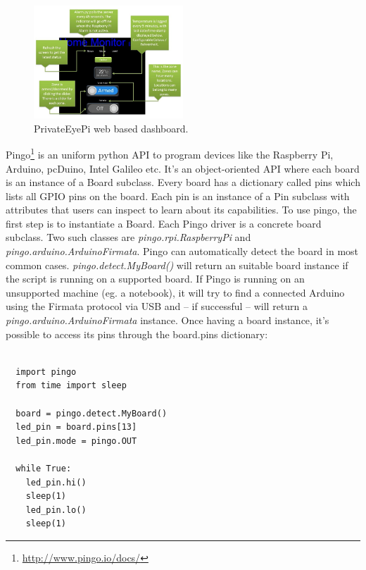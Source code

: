 \documentclass{acm_proc_article-sp}
\begin{document}
\begin{figure}[h]
    \includegraphics[width=0.5\textwidth,natwidth=610,natheight=642]{pictures/dashboardPrivateeye.png}
    \caption{PrivateEyePi web based dashboard.\protect\cite{Privateeyepi}}
    \label{fig:PrivateEye}
\end{figure}
\newline
\newline
Pingo\footnote{\url{http://www.pingo.io/docs/}} is an uniform python API to program devices like the Raspberry Pi, Arduino, pcDuino, Intel Galileo etc. It's an object-oriented API where each board is an instance of a Board subclass. Every board has a dictionary called pins which lists all GPIO pins on the board. Each pin is an instance of a Pin subclass with attributes that users can inspect to learn about its capabilities.
\newline
\newline
To use pingo, the first step is to instantiate a Board. Each Pingo driver is a concrete board subclass. Two such classes are \textit{pingo.rpi.RaspberryPi} and \textit{pingo.arduino.ArduinoFirmata}. Pingo can automatically detect the board in most common cases.  \textit{pingo.detect.MyBoard()} will return an suitable board instance if the script is running on a supported board. If Pingo is running on an unsupported machine (eg. a notebook), it will try to find a connected Arduino using the Firmata protocol via USB and – if successful – will return a \textit{pingo.arduino.ArduinoFirmata} instance.
\newline
\newline
Once having a board instance, it’s possible to access its pins through the board.pins dictionary:
\renewcommand{\theFancyVerbLine}{
  \sffamily\textcolor[rgb]{0.5,0.5,0.5}{\scriptsize\arabic{FancyVerbLine}}}
\begin{verbatim}

  import pingo
  from time import sleep

  board = pingo.detect.MyBoard()
  led_pin = board.pins[13]
  led_pin.mode = pingo.OUT

  while True:
    led_pin.hi()
    sleep(1)
    led_pin.lo()
    sleep(1)	
\end{verbatim}
\end{document}
